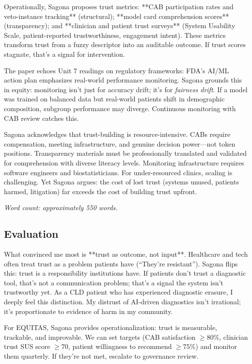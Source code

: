 \documentclass[12pt,twoside]{article}
\begin{document}
Operationally, Sagona proposes trust metrics: **CAB participation rates and veto-instance tracking** (structural); **model card comprehension scores** (transparency); and **clinician and patient trust surveys** (System Usability Scale, patient-reported trustworthiness, engagement intent). These metrics transform trust from a fuzzy descriptor into an auditable outcome. If trust scores stagnate, that's a signal for intervention.

The paper echoes Unit 7 readings on regulatory frameworks: FDA's AI/ML action plan emphasizes real-world performance monitoring. Sagona grounds this in equity: monitoring isn't just for accuracy drift; it's for \emph{fairness drift}. If a model was trained on balanced data but real-world patients shift in demographic composition, subgroup performance may diverge. Continuous monitoring with CAB review catches this.

Sagona acknowledges that trust-building is resource-intensive. CABs require compensation, meeting infrastructure, and genuine decision power—not token positions. Transparency materials must be professionally translated and validated for comprehension with diverse literacy levels. Monitoring infrastructure requires software engineers and biostatisticians. For under-resourced clinics, scaling is challenging. Yet Sagona argues: the cost of lost trust (systems unused, patients harmed, litigation) far exceeds the cost of building trust upfront.

\emph{Word count: approximately 550 words.}

\subsection*{Evaluation}

What convinced me most is **trust as outcome, not input**. Healthcare and tech often treat trust as a problem patients have (``They're resistant''). Sagona flips this: trust is a responsibility institutions have. If patients don't trust a diagnostic tool, that's not a communication problem; that's a signal the system isn't trustworthy yet. As a CLD patient who has experienced diagnostic erasure, I deeply feel this distinction. My distrust of AI-driven diagnostics isn't irrational; it's proportionate to evidence of harm in my community.

For EQUITAS, Sagona provides operationalization: trust is measurable, trackable, and improvable. We can set targets (CAB satisfaction $\ge 80\%$, clinician trust SUS score $\ge 70$, patient willingness to recommend $\ge 75\%$) and monitor them quarterly. If they're not met, escalate to governance review.
\end{document}
